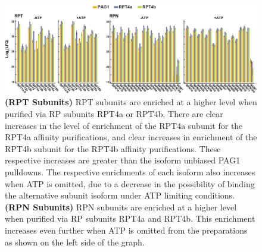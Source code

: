\begin{figure}
	\ContinuedFloat
	\centering
	\includegraphics[width=\columnwidth]{Proteasome/MSRP.png}
	{\textbf{(RPT Subunits)} RPT subunits are enriched at a higher level when purified via RP subunits RPT4a or RPT4b. There are clear increases in the level of enrichment of the RPT4a subunit for the RPT4a affinity purifications, and clear increases in enrichment of the RPT4b subunit for the RPT4b affinity purifications. These respective increases are greater than the isoform unbiased PAG1 pulldowns. The respective enrichments of each isoform also increases when ATP is omitted, due to a decrease in the possibility of binding the alternative subunit isoform under ATP limiting conditions. \textbf{(RPN Subunits)} RPN subunits are enriched at a higher level when purified via RP subunits RPT4a and RPT4b. This enrichment increases even further when ATP is omitted from the preparations as shown on the left side of the graph.}
	\label{fig:MSRP}
\end{figure}

